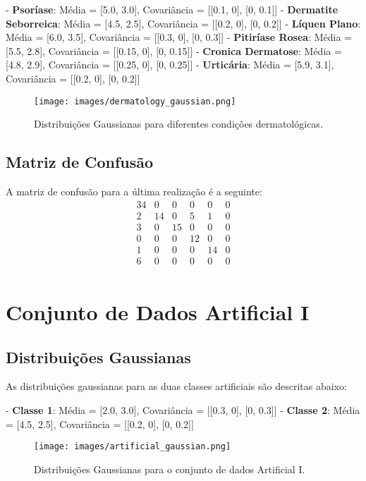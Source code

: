 \documentclass[12pt, a4paper]{report}
\begin{document}
- \textbf{Psoríase}: Média = [5.0, 3.0], Covariância = [[0.1, 0], [0, 0.1]]
- \textbf{Dermatite Seborreica}: Média = [4.5, 2.5], Covariância = [[0.2, 0], [0, 0.2]]
- \textbf{Líquen Plano}: Média = [6.0, 3.5], Covariância = [[0.3, 0], [0, 0.3]]
- \textbf{Pitiríase Rosea}: Média = [5.5, 2.8], Covariância = [[0.15, 0], [0, 0.15]]
- \textbf{Cronica Dermatose}: Média = [4.8, 2.9], Covariância = [[0.25, 0], [0, 0.25]]
- \textbf{Urticária}: Média = [5.9, 3.1], Covariância = [[0.2, 0], [0, 0.2]]

\begin{figure}[H]
\centering
\texttt{[image: images/dermatology\_gaussian.png]}
\caption{Distribuições Gaussianas para diferentes condições dermatológicas.}
\label{fig:gaussian_dermatology}
\end{figure}

\subsection{Matriz de Confusão}
A matriz de confusão para a última realização é a seguinte:
\[
\begin{array}{cccccc}
34 & 0 & 0 & 0 & 0 & 0 \\
2 & 14 & 0 & 5 & 1 & 0 \\
3 & 0 & 15 & 0 & 0 & 0 \\
0 & 0 & 0 & 12 & 0 & 0 \\
1 & 0 & 0 & 0 & 14 & 0 \\
6 & 0 & 0 & 0 & 0 & 0 \\
\end{array}
\]

\section{Conjunto de Dados Artificial I}

\subsection{Distribuições Gaussianas}
As distribuições gaussianas para as duas classes artificiais são descritas abaixo:

- \textbf{Classe 1}: Média = [2.0, 3.0], Covariância = [[0.3, 0], [0, 0.3]]
- \textbf{Classe 2}: Média = [4.5, 2.5], Covariância = [[0.2, 0], [0, 0.2]]

\begin{figure}[H]
\centering
\texttt{[image: images/artificial\_gaussian.png]}
\caption{Distribuições Gaussianas para o conjunto de dados Artificial I.}
\label{fig:gaussian_artificial}
\end{figure}
\end{document}
